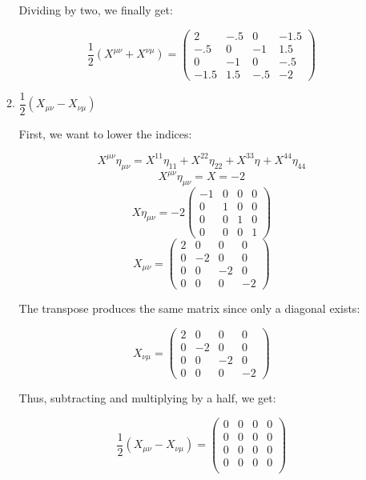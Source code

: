 \begin{enumerate}
\begin{enumerate}
        Dividing by two, we finally get:

        $$\boxed{\frac{1}{2}\left(X^{\mu\nu}+X^{\nu\mu}\right)=\left( \begin{matrix} 2 & -.5 & 0 & -1.5\\ -.5 & 0 & -1 & 1.5\\ 0 & -1 & 0 & -.5\\ -1.5 & 1.5 & -.5 & -2 \end{matrix}\right)}$$

      \item $\dfrac{1}{2}\left( X_{\mu\nu}-X_{\nu\mu} \right)$

        First, we want to lower the indices:

        $$X^{\mu\nu}\eta_{\mu\nu}=X^{11}\eta_{11}+X^{22}\eta_{22}+X^{33}\eta_{}+X^{44}\eta_{44}$$
        $$X^{\mu\nu}\eta_{\mu\nu}=X=-2$$
        $$X\eta_{\mu\nu}=-2\left( \begin{matrix}-1 & 0 & 0 & 0\\ 0 & 1 & 0 & 0\\ 0 & 0 & 1 & 0\\ 0 & 0 & 0 & 1\end{matrix} \right)$$
        $$X_{\mu\nu}=\left( \begin{matrix}2 & 0 & 0 & 0\\ 0 & -2 & 0 & 0\\ 0 & 0 & -2 & 0\\ 0 & 0 & 0 & -2\end{matrix} \right)$$

        The transpose produces the same matrix since only a diagonal exists:

        $$X_{\nu\mu}=\left( \begin{matrix}2 & 0 & 0 & 0\\ 0 & -2 & 0 & 0\\ 0 & 0 & -2 & 0\\ 0 & 0 & 0 & -2\end{matrix} \right)$$

        Thus, subtracting and multiplying by a half, we get:

        $$\boxed{\frac{1}{2}(X_{\mu\nu}-X_{\nu\mu})=\left( \begin{matrix} 0 & 0 & 0 & 0 \\ 0 & 0 & 0 & 0 \\0 & 0 & 0 & 0 \\0 & 0 & 0 & 0 \\\end{matrix}\right)}$$


\end{enumerate}
\end{enumerate}

